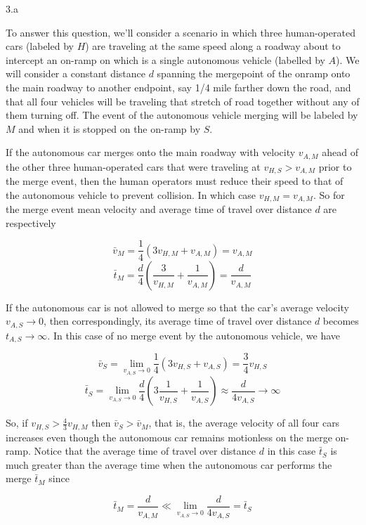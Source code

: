 \LARGE
3.a
\normalsize

\begin{answer}
  To answer this question, we'll consider a scenario in which three human-operated cars (labeled by $H$) are traveling at
  the same speed along a roadway about to intercept an on-ramp on which is a single autonomous vehicle (labelled by $A$).
  We will consider a constant distance $d$ spanning the mergepoint of the onramp onto the main roadway to another endpoint,
  say 1/4 mile farther down the road, and that all four vehicles will be traveling that stretch of road together without 
  any of them turning off. The event of the autonomous vehicle merging will be labeled by $M$ and when it is stopped on the
  on-ramp by $S$.

  If the autonomous car merges onto the main roadway with velocity $v_{A,M}$ ahead of the other three human-operated 
  cars that were traveling at $v_{H,S} > v_{A,M}$ prior to the merge event, then the human operators must reduce their 
  speed to that of the autonomous vehicle to prevent collision.  In which case $v_{H, M} = v_{A, M}$.  So for the merge event
  mean velocity and average time of travel over distance $d$ are respectively
  \begin{center}
    $$ \bar{v}_{M} = \frac{1}{4} (3 v_{H,M} + v_{A,M}) = v_{A,M} $$
    $$ \bar{t}_{M} = \frac{d}{4} (\frac{3}{v_{H,M}} + \frac{1}{v_{A,M}}) = \frac{d}{v_{A,M}} $$
  \end{center}

  If the autonomous car is not allowed to merge so that the car's average velocity $v_{A,S} \rightarrow 0$, then correspondingly,
  its average time of travel over distance $d$ becomes $t_{A,S} \rightarrow \infty$.  In this case of no merge event by 
  the autonomous vehicle, we have
  \begin{center}
    $$ \bar{v}_{S} = \lim_{v_{A,S} \to 0} \frac{1}{4} (3 v_{H,S} + v_{A,S}) = \frac{3}{4} v_{H,S}$$
    $$ \bar{t}_{S} = \lim_{v_{A,S} \to 0} \frac{d}{4} (3 \frac{1}{v_{H,S}} + \frac{1}{v_{A,S}}) \approx \frac{d}{4 v_{A,S}} \rightarrow \infty $$
  \end{center}

  So, if $v_{H,S} > \frac{4}{3} v_{H,M}$ then $\bar{v}_{S} > \bar{v}_{M}$, that is, the average velocity of all four cars increases
  even though the autonomous car remains motionless on the merge on-ramp. Notice that the average time of travel over distance $d$ in
  this case $\bar{t}_{S}$ is much greater than the average time when the autonomous car performs the merge $\bar{t}_{M}$ since
  \begin{center}
    $$ \bar{t}_{M} = \frac{d}{v_{A,M}} \ll \lim_{v_{A,S} \to 0} \frac{d}{4 v_{A,S}} = \bar{t}_{S} $$
  \end{center}


\end{answer}
